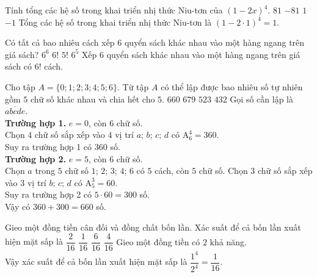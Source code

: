 \begin{ex}%
Tính tổng các hệ số trong khai triển nhị thức Niu-tơn của $\left(1-2x\right)^4$.
\choice
{$81$}
{$-81$}
{\True $1$}
{$-1$}
\loigiai
{
Tổng các hệ số trong khai triển nhị thức Niu-tơn là $\left(1-2\cdot1\right)^4=1$.
}
\end{ex}

\begin{ex}%
Có tất cả bao nhiêu cách xếp $6$ quyển sách khác nhau vào một hàng ngang trên giá sách?
\choice
{$6^6$}
{\True $6!$}
{$5!$}
{$6^5$}
\loigiai
{
Xếp $6$ quyển sách khác nhau vào một hàng ngang trên giá sách có $6!$ cách.
}
\end{ex}

\begin{ex}%
Cho tập $A=\{0;1;2;3;4;5;6\}$. Từ tập $A$ có thể lập được bao nhiêu số tự nhiên gồm $5$ chữ số khác nhau và chia hết cho $5$.
\choice
{\True $660$}
{$679$}
{$523$}
{$432$}
\loigiai
{
Gọi số cần lập là $\overline{abcde}$. \\
\textbf{Trường hợp 1.} $e=0$, còn $6$ chữ số. \\
Chọn $4$ chữ số sắp xếp vào $4$ vị trí $a$; $b$; $c$; $d$ có $\mathrm{A}_{6}^{4}=360$. \\
Suy ra trường hợp 1 có $360$ số. \\
\textbf{Trường hợp 2.} $e=5$, còn $6$ chữ số. \\
Chọn $a$ trong $5$ chữ số $1$; $2$; $3$; $4$; $6$ có $5$ cách, còn $5$ chữ số.
Chọn $3$ chữ số sắp xếp vào $3$ vị trí $b$; $c$; $d$ có $\mathrm{A}_{5}^{3}=60$. \\
Suy ra trường hợp 2 có $5\cdot60=300$ số. \\
Vậy có $360+300=660$ số.
}
\end{ex}

\begin{ex}%
Gieo một đồng tiền cân đối và đồng chất bốn lần. Xác suất để cả bốn lần xuất hiện mặt sấp là
\choice
{$\dfrac{2}{16}$}
{\True $\dfrac{1}{16}$}
{$\dfrac{6}{16}$}
{$\dfrac{4}{16}$}
\loigiai
{
Gieo một đồng tiền có $2$ khả năng. \\
Vậy xác suất để cả bốn lần xuất hiện mặt sấp là $\dfrac{1^4}{2^4}=\dfrac{1}{16}$.
}
\end{ex}

